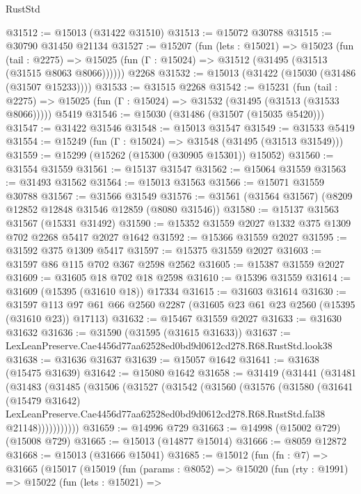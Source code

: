 \begin{lexlean}{RustStd}
\begin{coremodule}
@31512 := @15013 (@31422 @31510)
@31513 := @15072 @30788
@31515 := @30790 @31450 @21134
@31527 := @15207
    (fun (lets : @15021) =>
    @15023
      (fun (tail : @2275) =>
      @15025 (fun (Γ : @15024) => @31512 (@31495 (@31513 (@31515 @8063 @8066))))))
    @2268
@31532 := @15013 (@31422 (@15030 (@31486 (@31507 @15233))))
@31533 := @31515 @2268
@31542 := @15231
    (fun (tail : @2275) => @15025 (fun (Γ : @15024) => @31532 (@31495 (@31513 (@31533 @8066)))))
    @5419
@31546 := @15030 (@31486 (@31507 (@15035 @5420)))
@31547 := @31422 @31546
@31548 := @15013 @31547
@31549 := @31533 @5419
@31554 := @15249 (fun (Γ : @15024) => @31548 (@31495 (@31513 @31549)))
@31559 := @15299 (@15262 (@15300 (@30905 @15301)) @15052)
@31560 := @31554 @31559
@31561 := @15137 @31547
@31562 := @15064 @31559
@31563 := @31493 @31562
@31564 := @15013 @31563
@31566 := @15071 @31559 @30788
@31567 := @31566 @31549
@31576 := @31561 (@31564 @31567) (@8209 @12852 @12848 @31546 @12859 (@8080 @31546))
@31580 := @15137 @31563 @31567 (@15331 @31492)
@31590 := @15352 @31559 @2027 @1332 @375 @1309 @702 @2268 @5417 @2027 @1642
@31592 := @15366 @31559 @2027
@31595 := @31592 @375 @1309 @5417
@31597 := @15375 @31559 @2027
@31603 := @31597 @86 @115 @702 @367 @2598 @2562
@31605 := @15387 @31559 @2027
@31609 := @31605 @18 @702 @18 @2598
@31610 := @15396 @31559
@31614 := @31609 (@15395 (@31610 @18)) @17334
@31615 := @31603 @31614
@31630 := @31597
    @113
    @97
    @61
    @66
    @2560
    @2287
    (@31605 @23 @61 @23 @2560 (@15395 (@31610 @23)) @17113)
@31632 := @15467 @31559 @2027
@31633 := @31630 @31632
@31636 := @31590 (@31595 (@31615 @31633))
@31637 := LexLeanPreserve.Cae4456d77aa62528ed0bd9d0612cd278.R68.RustStd.look38
@31638 := @31636 @31637
@31639 := @15057 @1642
@31641 := @31638 (@15475 @31639)
@31642 := @15080 @1642
@31658 := @31419
    (@31441
      (@31481
        (@31483
          (@31485
            (@31506
              (@31527
                (@31542
                  (@31560
                    (@31576
                      (@31580
                        (@31641
                          (@15479 @31642)
                          LexLeanPreserve.Cae4456d77aa62528ed0bd9d0612cd278.R68.RustStd.fal38
                          @21148)))))))))))
@31659 := @14996 @729
@31663 := @14998 (@15002 @729) (@15008 @729)
@31665 := @15013 (@14877 @15014)
@31666 := @8059 @12872
@31668 := @15013 (@31666 @15041)
@31685 := @15012
    (fun (fn : @7) =>
    @31665
      (@15017
        (@15019
          (fun (params : @8052) =>
          @15020
            (fun (rty : @1991) =>
            @15022
              (fun (lets : @15021) =>

\end{coremodule}
\end{lexlean}
